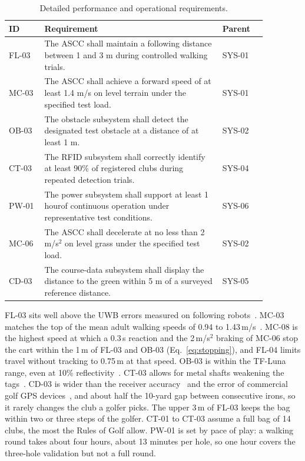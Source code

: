 \begin{table}[H]
\centering
\caption{Detailed performance and operational requirements.}
\label{tab:app-performance}
\footnotesize
\begin{tabular}{p{0.12\linewidth} p{0.60\linewidth} p{0.15\linewidth}}
\hline
\textbf{ID} & \textbf{Requirement} & \textbf{Parent} \\
\hline
FL-03 & The ASCC shall maintain a following distance between 1 and 3 m during controlled walking trials. & SYS-01 \\
MC-03 & The ASCC shall achieve a forward speed of at least 1.4 m/s on level terrain under the specified test load. & SYS-01 \\
OB-03 & The obstacle subsystem shall detect the designated test obstacle at a distance of at least 1 m. & SYS-02 \\
CT-03 & The RFID subsystem shall correctly identify at least 90\% of registered clubs during repeated detection trials. & SYS-04 \\
PW-01 & The power subsystem shall support at least 1 hourof continuous operation under representative test conditions. & SYS-06 \\
MC-06 & The ASCC shall decelerate at no less than 2 m/s$^2$ on level grass under the specified test load. & SYS-02 \\
CD-03 & The course-data subsystem shall display the distance to the green within 5 m of a surveyed reference distance. & SYS-05 \\
\hline
\end{tabular}
\end{table}

FL-03 sits well above the \acs{UWB} errors measured on following robots~\cite{bae2022uwb,zhang2024stroller}. MC-03 matches the top of the mean adult walking speeds of 0.94 to 1.43\,m/s~\cite{bohannon2011walking}. MC-08 is the highest speed at which a 0.3\,s reaction and the 2\,m/s$^2$ braking of MC-06 stop the cart within the 1\,m of FL-03 and OB-03 (Eq.~\eqref{eq:stopping}), and FL-04 limits travel without tracking to 0.75\,m at that speed. OB-03 is within the TF-Luna range, even at 10\% reflectivity~\cite{tflunads}. CT-03 allows for metal shafts weakening the tags~\cite{dobkin2005rfid}. CD-03 is wider than the receiver accuracy~\cite{neom8ds} and the error of commercial golf \acs{GPS} devices~\cite{hall2025golfGps}, and about half the 10-yard gap between consecutive irons, so it rarely changes the club a golfer picks. The upper 3\,m of FL-03 keeps the bag within two or three steps of the golfer. CT-01 to CT-03 assume a full bag of 14 clubs, the most the Rules of Golf allow. PW-01 is set by pace of play: a walking round takes about four hours, about 13 minutes per hole, so one hour covers the three-hole validation but not a full round.


